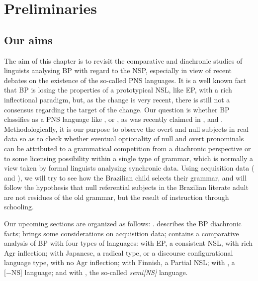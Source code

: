 \documentclass[output=paper]{langsci/langscibook}
\begin{document}
\section{Preliminaries}\label{sec:key:26.2}

\subsection{Our aims}\label{sec:key:26.2.1}

The aim of this chapter is to revisit the comparative and diachronic studies of
linguists analysing \gls{BP} with regard to the \gls{NSP}, especially in view
of recent debates on the existence of the so-called \gls{PNS} languages.  It is
a well known fact that \gls{BP} is losing the
properties of a prototypical \gls{NSL}, like \gls{EP}, with a rich
inflectional paradigm, but, as the change is very recent, there is still not a
consensus regarding the target of the change. Our question is whether
\gls{BP} classifies as a \gls{PNS} language like
,  or , as was recently claimed in \citet{Holmberg2010},
and \citet{HolShee2010}. Methodologically, it is our purpose to observe
the overt and null subjects in real data so as to check whether eventual
optionality of null and overt pronominals can be attributed to a grammatical
competition from a diachronic perspective \citep{Kroch1994} or to some
licensing possibility within a single type of grammar, which is normally a view
taken by formal linguists analysing synchronic data. Using acquisition data
(\citealt{Magalhaes2003} and \citealt{Kato2011}), we will try to see how the
Brazilian child selects their grammar, and will follow the hypothesis that null
referential subjects in the Brazilian literate adult are not residues of the
old grammar, but the result of instruction through schooling.

Our  upcoming sections are organized as follows:  .
describes the \gls{BP} diachronic facts;
 brings some considerations on acquisition data;
 contains a comparative analysis of \gls{BP} with four types of languages:  with
\gls{EP}, a consistent \gls{NSL}, with rich Agr
inflection;  with Japanese, a radical type, or a discourse
configurational language type, with no Agr inflection; 
with Finnish, a Partial \gls{NSL};  with , a
[−NS] language; and  with , the so-called
\emph{semi[NS]} language.
\end{document}
